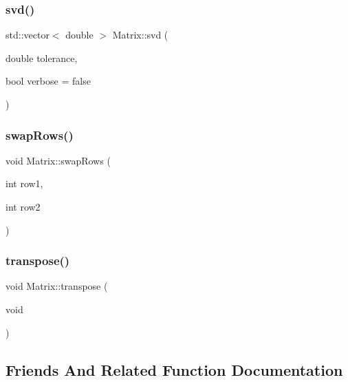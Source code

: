 \mbox{\label{class_matrix_a9fd5f24302f779d7341fdd06bb23bb90}} 
\subsubsection{\texorpdfstring{svd()}{svd()}}
{\footnotesize\ttfamily std\+::vector$<$ double $>$ Matrix\+::svd (\begin{DoxyParamCaption}\item[{double}]{tolerance,  }\item[{bool}]{verbose = {\ttfamily false} }\end{DoxyParamCaption})}

\mbox{\label{class_matrix_a3d028bc7d149b4f87c847cf0ff50aa18}} 
\subsubsection{\texorpdfstring{swap\+Rows()}{swapRows()}}
{\footnotesize\ttfamily void Matrix\+::swap\+Rows (\begin{DoxyParamCaption}\item[{int}]{row1,  }\item[{int}]{row2 }\end{DoxyParamCaption})}

\mbox{\label{class_matrix_ac9afd875262d35e1bab18604e3bc121c}} 
\subsubsection{\texorpdfstring{transpose()}{transpose()}}
{\footnotesize\ttfamily void Matrix\+::transpose (\begin{DoxyParamCaption}\item[{void}]{ }\end{DoxyParamCaption})}



\subsection{Friends And Related Function Documentation}
\mbox{\label{class_matrix_ac7214274c9ef83ebef022af7225ac068}} 

